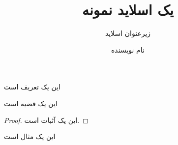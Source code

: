 \documentclass{beamer}
\title{یک اسلاید نمونه}
\subtitle{زیرعنوان اسلاید}
\author{نام نویسنده}
\begin{document}
	
	\begin{frame}
	\ptext[1]
	\begin{definition}
		این یک تعریف است
	\end{definition}
	\begin{theorem}
		این یک قضیه است
	\end{theorem}
	
	\begin{proof}
		این یک آثبات است.
	\end{proof}
	
	\begin{example}
		این یک مثال است
	\end{example}
\end{frame}
\end{document}
